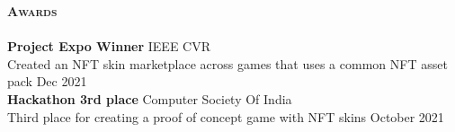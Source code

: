 \documentclass[a4paper]{article}
\newcommand{\lineunder} {
    \vspace*{-8pt} \\
    \hspace*{-18pt} \hrulefill \\
}
\newcommand{\header} [1] {
    {\hspace*{-18pt}\vspace*{6pt} \textbf{\textsc{#1}}}
    \vspace*{-6pt} \lineunder
}
\begin{document}
\header{Awards}
\textbf{Project Expo Winner} \hfill IEEE CVR\\
Created an NFT skin marketplace across games that uses a common NFT asset pack \hfill Dec 2021\\
\vspace{2mm}
\textbf{Hackathon 3rd place} \hfill Computer Society Of India\\
Third place for creating a proof of concept game with NFT skins \hfill October 2021\\
\vspace{2mm}
\end{document}
